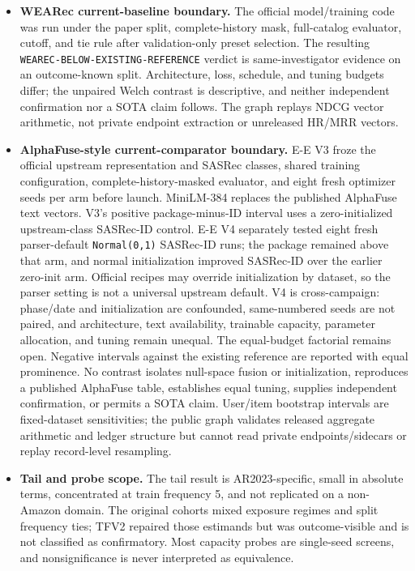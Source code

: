 \begin{itemize}
\item
  \textbf{WEARec current-baseline boundary.} The official model/training code was run under the paper split, complete-history mask, full-catalog evaluator, cutoff, and tie rule after validation-only preset selection. The resulting \texttt{WEAREC-BELOW-EXISTING-REFERENCE} verdict is same-investigator evidence on an outcome-known split. Architecture, loss, schedule, and tuning budgets differ; the unpaired Welch contrast is descriptive, and neither independent confirmation nor a SOTA claim follows. The graph replays NDCG vector arithmetic, not private endpoint extraction or unreleased HR/MRR vectors.
\item
  \textbf{AlphaFuse-style current-comparator boundary.} E-E V3 froze the official upstream representation and SASRec classes, shared training configuration, complete-history-masked evaluator, and eight fresh optimizer seeds per arm before launch. MiniLM-384 replaces the published AlphaFuse text vectors. V3's positive package-minus-ID interval uses a zero-initialized upstream-class SASRec-ID control. E-E V4 separately tested eight fresh parser-default \texttt{Normal(0,1)} SASRec-ID runs; the package remained above that arm, and normal initialization improved SASRec-ID over the earlier zero-init arm. Official recipes may override initialization by dataset, so the parser setting is not a universal upstream default. V4 is cross-campaign: phase/date and initialization are confounded, same-numbered seeds are not paired, and architecture, text availability, trainable capacity, parameter allocation, and tuning remain unequal. The equal-budget factorial remains open. Negative intervals against the existing reference are reported with equal prominence. No contrast isolates null-space fusion or initialization, reproduces a published AlphaFuse table, establishes equal tuning, supplies independent confirmation, or permits a SOTA claim. User/item bootstrap intervals are fixed-dataset sensitivities; the public graph validates released aggregate arithmetic and ledger structure but cannot read private endpoints/sidecars or replay record-level resampling.
\item
  \textbf{Tail and probe scope.} The tail result is AR2023-specific, small in absolute terms, concentrated at train frequency 5, and not replicated on a non-Amazon domain. The original cohorts mixed exposure regimes and split frequency ties; TFV2 repaired those estimands but was outcome-visible and is not classified as confirmatory. Most capacity probes are single-seed screens, and nonsignificance is never interpreted as equivalence.

\end{itemize}
